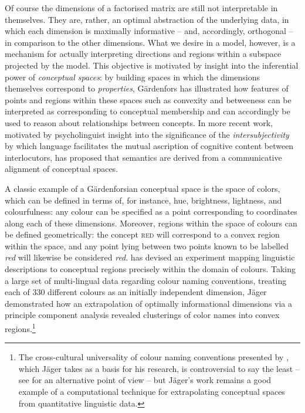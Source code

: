 {Of course the dimensions of a factorised matrix are still not interpretable in themselves.  They are, rather, an optimal abstraction of the underlying data, in which each dimension is maximally informative -- and, accordingly, orthogonal -- in comparison to the other dimensions.  What we desire in a model, however, is a mechanism for actually interpreting directions and regions within a subspace projected by the model.  This objective is motivated by \cite{Gardenfors2000} insight into the inferential power of \emph{conceptual spaces}: by building spaces in which the dimensions themselves correspond to \emph{properties}, G\"{a}rdenfors has illustrated how features of points and regions within these spaces such as convexity and betweeness can be interpreted as corresponding to conceptual membership and can accordingly be used to reason about relationships between concepts.  In more recent work, motivated by psycholinguist insight into the significance of the \emph{intersubjectivity} by which language facilitates the mutual ascription of cognitive content between interlocutors, \cite{Gardenfors2014} has proposed that semantics are derived from a communicative alignment of conceptual spaces.

A classic example of a G\"{a}rdenforsian conceptual space is the space of colors, which can be defined in terms of, for instance, hue, brightness, lightness, and colourfulness: any colour can be specified as a point corresponding to coordinates along each of these dimensions.  Moreover, regions within the space of colours can be defined geometrically: the concept \textsc{red} will correspond to a convex region within the space, and any point lying between two points known to be labelled \emph{red} will likewise be considered \emph{red}.  \cite{Jager} has devised an experiment mapping linguistic descriptions to conceptual regions precisely within the domain of colours.  Taking a large set of multi-lingual data regarding colour naming conventions, treating each of 330 different colours as an initially independent dimension, J\"{a}ger demonstrated how an extrapolation of optimally informational dimensions via a principle component analysis revealed clusterings of color names into convex regions.\footnote{The cross-cultural universality of colour naming conventions presented by \cite{KayEA1999}, which J\"{a}ger takes as a basis for his research, is controversial to say the least -- see \cite{Levinson2001} for an alternative point of view -- but J\"{a}ger's work remains a good example of a computational technique for extrapolating conceptual spaces from quantitative linguistic data.}

}
